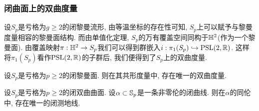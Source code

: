 \subsubsection{闭曲面上的双曲度量}
设$S_p$是亏格为$g\ge 2$的闭黎曼流形, 由等温坐标的存在性可知, $S_p$上可以赋予与黎曼度量相容的黎曼面结构. 而由单值化定理, $S_p$的万有覆盖空间同构于$\HH$(作为一个黎曼面). 由覆盖映射$\pi: \HH \to S_p$我们可以得到群嵌入$i: \pi_1(S_p) \hookrightarrow \psl(2,\R)$.  这样将$\pi_1(S_p)$看作$\psl(2,\R)$的子群后, 我们便得到了$S_p$上的双曲度量.
\begin{theorem}
    设$S_p$是亏格为$p \ge 2$的闭黎曼面. 则在其共形度量中, 存在唯一的双曲度量.
\end{theorem}
\begin{theorem}
    设$S_p$是亏格为$p \ge 2$的闭双曲曲面. 设$\alpha \subset \S_p$是一条非零伦的闭曲线. 则在$\alpha$的同伦中, 存在唯一的闭测地线.
\end{theorem}
